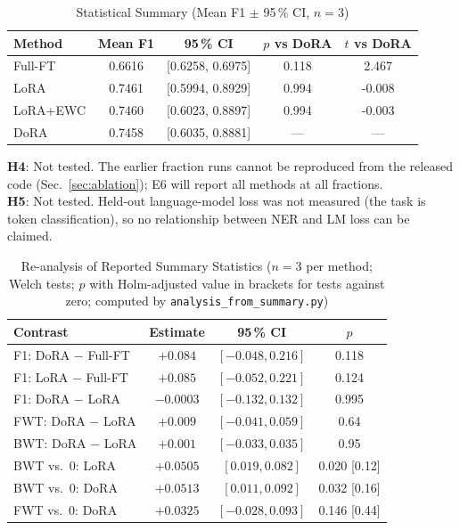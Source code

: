 \documentclass[11pt,a4paper]{article}
\begin{document}
\begin{table}[!htbp]
\caption{Statistical Summary (Mean F1 $\pm$ 95\,\% CI, $n=3$)}
\label{tab:stats}
\centering
\footnotesize
\setlength{\tabcolsep}{2.5pt}
\begin{tabular}{lcccc}
\toprule
\textbf{Method} & \textbf{Mean F1} & \textbf{95\,\% CI} & \textbf{$p$ vs DoRA} & \textbf{$t$ vs DoRA} \\
\midrule
Full-FT  & 0.6616 & [0.6258, 0.6975] & 0.118  &  2.467 \\
LoRA     & 0.7461 & [0.5994, 0.8929] & 0.994  & -0.008 \\
LoRA+EWC & 0.7460 & [0.6023, 0.8897] & 0.994  & -0.003 \\
DoRA     & 0.7458 & [0.6035, 0.8881] & ---    &  ---   \\
\bottomrule
\end{tabular}
\end{table}

\textbf{H4}: Not tested.  The earlier fraction runs cannot be
reproduced from the released code (Sec.~\ref{sec:ablation}); E6 will
report all methods at all fractions.\\
\textbf{H5}: Not tested.  Held-out language-model loss was not
measured (the task is token classification), so no relationship between
NER and LM loss can be claimed.

\begin{table}[!htbp]
\caption{Re-analysis of Reported Summary Statistics ($n=3$ per
method; Welch tests; $p$ with Holm-adjusted value in brackets for
tests against zero; computed by \texttt{analysis\_from\_summary.py})}
\label{tab:derived}
\centering
\footnotesize
\setlength{\tabcolsep}{3pt}
\begin{tabular}{lccc}
\toprule
\textbf{Contrast} & \textbf{Estimate} & \textbf{95\,\% CI} & \textbf{$p$} \\
\midrule
F1: DoRA $-$ Full-FT  & $+0.084$ & $[-0.048, 0.216]$ & 0.118 \\
F1: LoRA $-$ Full-FT  & $+0.085$ & $[-0.052, 0.221]$ & 0.124 \\
F1: DoRA $-$ LoRA     & $-0.0003$ & $[-0.132, 0.132]$ & 0.995 \\
FWT: DoRA $-$ LoRA    & $+0.009$ & $[-0.041, 0.059]$ & 0.64 \\
BWT: DoRA $-$ LoRA    & $+0.001$ & $[-0.033, 0.035]$ & 0.95 \\
\midrule
BWT vs.\ 0: LoRA      & $+0.0505$ & $[0.019, 0.082]$ & 0.020 [0.12] \\
BWT vs.\ 0: DoRA      & $+0.0513$ & $[0.011, 0.092]$ & 0.032 [0.16] \\
FWT vs.\ 0: DoRA      & $+0.0325$ & $[-0.028, 0.093]$ & 0.146 [0.44] \\
\bottomrule
\end{tabular}
\end{table}
\end{document}
